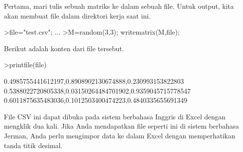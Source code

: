 \documentclass[a4paper,10pt]{article}
\begin{document}
\begin{eulernotebook}
\begin{eulercomment}
\begin{eulercomment}
\begin{eulercomment}
\begin{eulercomment}
\begin{eulercomment}
\begin{eulercomment}
\begin{eulercomment}
Pertama, mari tulis sebuah matriks ke dalam sebuah file. Untuk output,
kita akan membuat file dalam direktori kerja saat ini.
\end{eulercomment}
\begin{eulerprompt}
>file="test.csv";  ...
>M=random(3,3); writematrix(M,file);
\end{eulerprompt}
\begin{eulercomment}
Berikut adalah konten dari file tersebut.
\end{eulercomment}
\begin{eulerprompt}
>printfile(file)
\end{eulerprompt}
\begin{euleroutput}
  0.4985755441612197,0.8908902130674888,0.230993153822803
  0.5388022720805338,0.03150264484701902,0.9359045715778547
  0.6011875635483036,0.1012503400474223,0.4840335655691349
  
\end{euleroutput}
\begin{eulercomment}
File CSV ini dapat dibuka pada sistem berbahasa Inggris di Excel
dengan mengklik dua kali. Jika Anda mendapatkan file seperti ini di
sistem berbahasa Jerman, Anda perlu mengimpor data ke dalam Excel
dengan memperhatikan tanda titik desimal.


\end{eulercomment}
\end{eulercomment}
\end{eulercomment}
\end{eulercomment}
\end{eulercomment}
\end{eulercomment}
\end{eulercomment}
\end{eulernotebook}
\end{document}
